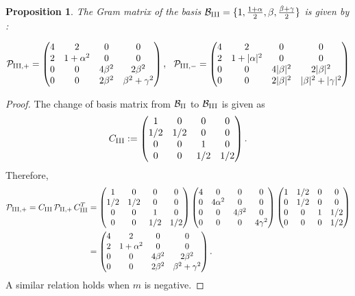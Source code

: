 \documentclass[table]{amsart}
\newtheorem{proposition}[theorem]{Proposition}
\numberwithin{equation}{section}
\begin{document}
\begin{proposition}\label{4.5 propn}
The Gram matrix of the basis $\mathcal{B}_{\rm{III}} = \{1,\frac{1 + \alpha}{2},\beta,\frac{\beta + \gamma}{2}\}$ is given by :

$$
\mathcal{P}_{\rm{III}, +}=  
\begin{pmatrix} 4 & 2 & 0 & 0 \\ 2 & 1 + \alpha^2 & 0 & 0 \\ 0 & 0 & 4\beta^2 & 2\beta^2 \\ 0 & 0 & 2\beta^2 & \beta^2 + \gamma^2 \end{pmatrix}, \ \ 
\mathcal{P}_{\rm{III}, -} =  
\begin{pmatrix} 4 & 2 & 0 & 0 \\ 
2 & 1 + |\alpha|^2 & 0 & 0 \\ 
0 & 0 & 4|\beta|^2 & 2|\beta|^2 \\ 
0 & 0 & 2|\beta|^2 & |\beta|^2 + |\gamma|^2 
\end{pmatrix}
$$
\end{proposition}

\begin{proof}
    The change of basis matrix from $\mathcal{B}_{\rm{II}}$ to $\mathcal{B}_{\rm{III}}$ is given as
    $$
    C_{\rm{III}}:= 
    \begin{pmatrix}
1 & 0 & 0 & 0 \\
1/2 & 1/2 & 0 & 0 \\
0 & 0 & 1 & 0 \\
0 & 0 & 1/2 & 1/2
\end{pmatrix}.
    $$
    Therefore, 
    \begin{align*}
    \mathcal{P}_{\rm{III},+}= C_{\rm{III}} \, \mathcal{P}_{\rm{II},+} \, C_{\rm{III}}^T &= 
     \begin{pmatrix}
1 & 0 & 0 & 0 \\
1/2 & 1/2 & 0 & 0 \\
0 & 0 & 1 & 0 \\
0 & 0 & 1/2 & 1/2
\end{pmatrix}
\begin{pmatrix}
4 & 0 & 0 & 0 \\
0 & 4\alpha^2 & 0 & 0 \\
0 & 0 & 4\beta^2 & 0 \\
0 & 0 & 0 & 4\gamma^2
\end{pmatrix}
 \begin{pmatrix}
1 & 1/2 & 0 & 0 \\
0 & 1/2 & 0 & 0 \\
0 & 0 & 1 &  1/2 \\
0 & 0 &0 & 1/2
\end{pmatrix} \\ 
&= \begin{pmatrix} 4 & 2 & 0 & 0 \\ 2 & 1 + \alpha^2 & 0 & 0 \\ 0 & 0 & 4\beta^2 & 2\beta^2 \\ 0 & 0 & 2\beta^2 & \beta^2 + \gamma^2 \end{pmatrix}.
    \end{align*}
A similar relation holds when $m$ is negative.
\end{proof}
\end{document}
